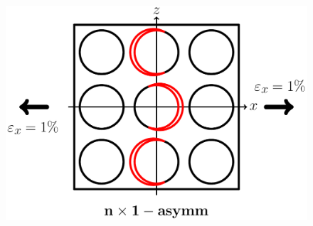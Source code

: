 \documentclass[first,firstsupp,lastsupp,last,hyperref,table]{ETHclass}
\begin{document}
\begin{frame}
\begin{columns}
\begin{column}{0.35\textwidth}
\begin{figure}
\end{figure}
\vspace{-0.5cm}
\begin{figure}
\centering
\includegraphics[width=\columnwidth]{twofibers-oppositeside-dtheta110.pdf}
\end{figure}
\end{column}
\end{columns}
\end{frame}

\addtocounter{framenumber}{-1}
\end{document}
